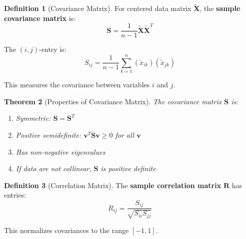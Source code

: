 \documentclass[12pt]{article}
\numberwithin{equation}{section}
\newcommand{\vect}[1]{\boldsymbol{#1}}   %
\newcommand{\mat}[1]{\mathbf{#1}}        %
\theoremstyle{plain}
\newtheorem{theorem}{Theorem}[section]
\theoremstyle{definition}
\newtheorem{definition}[theorem]{Definition}
\theoremstyle{remark}
\begin{document}
\begin{definition}[Covariance Matrix]
For centered data matrix $\tilde{\mat{X}}$, the \textbf{sample covariance matrix} is:
$$\mat{S} = \frac{1}{n-1}\tilde{\mat{X}}\tilde{\mat{X}}^T$$

The $(i,j)$-entry is:
$$S_{ij} = \frac{1}{n-1}\sum_{k=1}^n (\tilde{x}_{ik})(\tilde{x}_{jk})$$

This measures the covariance between variables $i$ and $j$.
\end{definition}

\begin{theorem}[Properties of Covariance Matrix]
The covariance matrix $\mat{S}$ is:
\begin{enumerate}
\item Symmetric: $\mat{S} = \mat{S}^T$
\item Positive semidefinite: $\vect{v}^T\mat{S}\vect{v} \geq 0$ for all $\vect{v}$
\item Has non-negative eigenvalues
\item If data are not collinear, $\mat{S}$ is positive definite
\end{enumerate}
\end{theorem}

\begin{definition}[Correlation Matrix]
The \textbf{sample correlation matrix} $\mat{R}$ has entries:
$$R_{ij} = \frac{S_{ij}}{\sqrt{S_{ii}S_{jj}}}$$

This normalizes covariances to the range $[-1, 1]$.
\end{definition}
\end{document}
